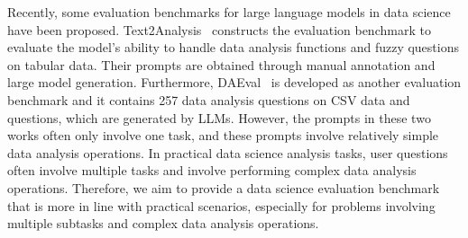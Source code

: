 Recently, some evaluation benchmarks for large language models in data science have been proposed. 
Text2Analysis~\citep{he2024text2analysis} constructs the evaluation benchmark to evaluate the model's ability to handle data analysis functions and fuzzy questions on tabular data. Their prompts are obtained through manual annotation and large model generation.
Furthermore, DAEval~\citep{huinfiagent} is developed as another evaluation benchmark and it contains 257 data analysis questions on CSV data and questions, which are generated by LLMs.
However, the prompts in these two works often only involve one task, and these prompts involve relatively simple data analysis operations.
In practical data science analysis tasks, user questions often involve multiple tasks and involve performing complex data analysis operations.
Therefore, we aim to provide a data science evaluation benchmark that is more in line with practical scenarios, especially for problems involving multiple subtasks and complex data analysis operations.
